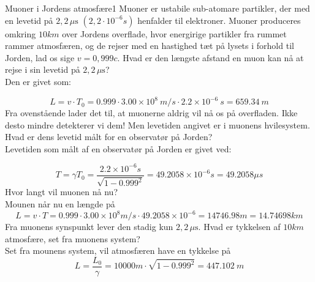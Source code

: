 \documentclass[crop=false, class=memoir]{standalone}
\begin{document}
\begin{opgave}{Muoner i Jordens atmosfære}{1}
	Muoner er ustabile sub-atomare partikler, der med en levetid på $2,2 \,\mu\si{\s}$ $(2,2 \cdot 10^{-6} \si{s})$ henfalder til elektroner.
	Muoner produceres omkring $10 \si{km}$ over Jordens overflade, hvor energirige partikler fra rummet rammer
	atmosfæren, og de rejser med en hastighed tæt på lysets i forhold til Jorden, lad os sige $v = 0,999c$.
	\opg Hvad er den længste afstand en muon kan nå at rejse i sin levetid på $2,2 \,\mu\si{\s}$?\\
	
	Den er givet som:
	
	$$L = v \cdot T_0 = 0.999 \cdot 3.00 \times 10^8 \ \si{m/s} \cdot 2.2 \times 10^{-6} \ \si{s} = \SI{659.34}{m}$$
	\opg Fra ovenstående lader det til, at muonerne aldrig vil nå os på overfladen. Ikke desto mindre detekterer vi
	dem! Men levetiden angivet er i muonens hvilesystem. Hvad er dens levetid målt for en observatør på
	Jorden?\\
	
	Levetiden som målt af en observatør på Jorden er givet ved:
	
	$$T=\gamma T_0=\frac{2.2 \times 10^{-6}\si{s}}{\sqrt{1-0.999^2}}=49.2058 \times 10^{-6}\si{s}=49.2058\mu\si{s} $$
	\opg Hvor langt vil muonen nå nu?\\
	
	Mounen når nu en længde på 
	$$L=v \cdot T=0.999 \cdot 3.00 \times 10^8 \si{m/s} \cdot 49.2058 \times 10^{-6} = 14746.98 \si{m} = 14.74698 \si{km}$$
	\opg Fra muonens synspunkt lever den stadig kun $2,2 \, \mu\si{\s}$. Hvad er tykkelsen af $10 \si{km}$ atmosfære, set fra
	muonens system?\\
	
	Set fra mounens system, vil atmosfæren have en tykkelse på
	$$L=\frac{L_0}{\gamma}=10000 \si{m} \cdot \sqrt{1-0.999^2} = 447.102 \ \si{m}$$
\end{opgave}
\end{document}

